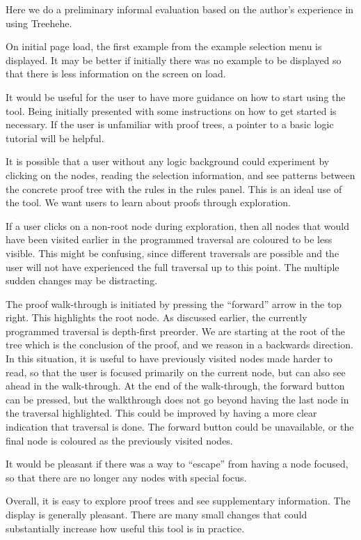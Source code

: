 \documentclass[journal]{vgtc}                %
\newcommand{\projectname}{Treehehe}
\begin{document}
Here we do a preliminary informal evaluation based on the author's experience in using \projectname{}.

On initial page load, the first example from the example selection menu is displayed. It may be better if initially there was no example to be displayed so that there is less information on the screen on load.

It would be useful for the user to have more guidance on how to start using the tool. Being initially presented with some instructions on how to get started is necessary. If the user is unfamiliar with proof trees, a pointer to a basic logic tutorial will be helpful.

It is possible that a user without any logic background could experiment by clicking on the nodes, reading the selection information, and see patterns between the concrete proof tree with the rules in the rules panel. This is an ideal use of the tool. We want users to learn about proofs through exploration.

If a user clicks on a non-root node during exploration, then all nodes that would have been visited earlier in the programmed traversal are coloured to be less visible. This might be confusing, since different traversals are possible and the user will not have experienced the full traversal up to this point. The multiple sudden changes may be distracting.

The proof walk-through is initiated by pressing the ``forward'' arrow in the top right. This highlights the root node. As discussed earlier, the currently programmed traversal is depth-first preorder. We are starting at the root of the tree which is the conclusion of the proof, and we reason in a backwards direction. In this situation, it is useful to have previously visited nodes made harder to read, so that the user is focused primarily on the current node, but can also see ahead in the walk-through. At the end of the walk-through, the forward button can be pressed, but the walkthrough does not go beyond having the last node in the traversal highlighted. This could be improved by having a more clear indication that traversal is done. The forward button could be unavailable, or the final node is coloured as the previously visited nodes.

It would be pleasant if there was a way to ``escape'' from having a node focused, so that there are no longer any nodes with special focus.

Overall, it is easy to explore proof trees and see supplementary information. The display is generally pleasant. There are many small changes that could substantially increase how useful this tool is in practice.
\end{document}
